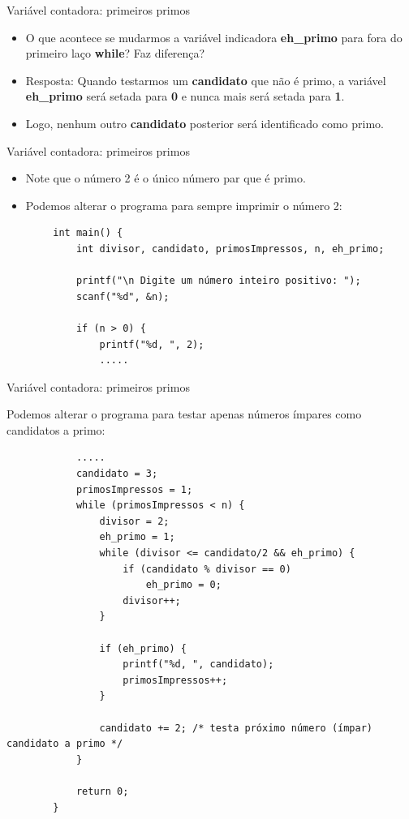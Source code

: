 \documentclass[handout]{beamer}
\begin{document}
\begin{frame}[fragile]{Variável contadora: primeiros primos}
    
    \begin{itemize}
        \item O que acontece se mudarmos a variável indicadora {\bf eh\_primo} para fora do primeiro laço {\bf while}? Faz diferença?
        \item Resposta: Quando testarmos um {\bf candidato} que não é primo, a variável {\bf eh\_primo} será setada para {\bf 0} e nunca mais será setada para {\bf 1}.
        \item Logo, nenhum outro {\bf candidato} posterior será identificado como primo.
    \end{itemize}
\end{frame}

\begin{frame}[fragile]{Variável contadora: primeiros primos}

    \begin{itemize}
        \item Note que o número 2 é o único número par que é primo.
        \item Podemos alterar o programa para sempre imprimir o número 2:
    \end{itemize}

    \begin{verbatim}
        int main() {
            int divisor, candidato, primosImpressos, n, eh_primo;

            printf("\n Digite um número inteiro positivo: ");
            scanf("%d", &n);

            if (n > 0) {
                printf("%d, ", 2);
                .....
    \end{verbatim}
\end{frame}

\begin{frame}[fragile]{Variável contadora: primeiros primos}

    Podemos alterar o programa para testar apenas números ímpares como candidatos a primo:

    \begin{verbatim}
            .....
            candidato = 3;
            primosImpressos = 1;
            while (primosImpressos < n) {
                divisor = 2;
                eh_primo = 1;
                while (divisor <= candidato/2 && eh_primo) {
                    if (candidato % divisor == 0)
                        eh_primo = 0;
                    divisor++;
                }

                if (eh_primo) {
                    printf("%d, ", candidato);
                    primosImpressos++;
                }

                candidato += 2; /* testa próximo número (ímpar) candidato a primo */
            }

            return 0;
        }
    \end{verbatim}
\end{frame}
\end{document}
